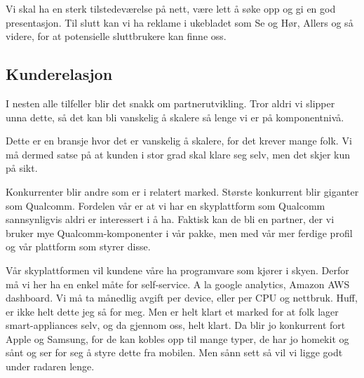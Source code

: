 Vi skal ha en sterk tilstedeværelse på nett, være lett å søke opp og gi en god
presentasjon. Til slutt kan vi ha reklame i ukebladet som Se og Hør, Allers og
så videre, for at potensielle sluttbrukere kan finne oss.

\subsection{Kunderelasjon}



I nesten alle tilfeller blir det snakk om partnerutvikling. Tror aldri vi
slipper unna dette, så det kan bli vanskelig å skalere så lenge vi er på
komponentnivå.

Dette er en bransje hvor det er vanskelig å skalere, for det krever mange folk.
Vi må dermed satse på at kunden i stor grad skal klare seg selv, men det skjer
kun på sikt.

Konkurrenter blir andre som er i relatert marked. Største konkurrent blir
giganter som Qualcomm. Fordelen vår er at vi har en skyplattform som Qualcomm
sannsynligvis aldri er interessert i å ha. Faktisk kan de bli en partner, der
vi bruker mye Qualcomm-komponenter i vår pakke, men med vår mer ferdige profil
og vår plattform som styrer disse.

Vår skyplattformen vil kundene våre ha programvare som kjører i skyen. Derfor
må vi her ha en enkel måte for self-service. A la google analytics, Amazon AWS
dashboard. Vi må ta månedlig avgift per device, eller per CPU og nettbruk.
Huff, er ikke helt dette jeg så for meg. Men er helt klart et marked for at
folk lager smart-appliances selv, og da gjennom oss, helt klart. Da blir jo
konkurrent fort Apple og Samsung, for de kan kobles opp til mange typer, de har
jo homekit og sånt og ser for seg å styre dette fra mobilen.
Men sånn sett så vil vi ligge godt under radaren lenge.

